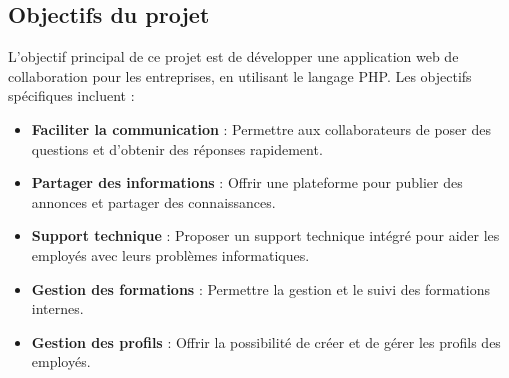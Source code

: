 \documentclass{article}
\begin{document}
        \subsection{Objectifs du projet}
            L'objectif principal de ce projet est de développer une application web de collaboration pour les entreprises, en utilisant le langage PHP. Les objectifs spécifiques incluent :

            \begin{itemize}
                \item \textbf{Faciliter la communication} : Permettre aux collaborateurs de poser des questions et d'obtenir des réponses rapidement.
                \item \textbf{Partager des informations} : Offrir une plateforme pour publier des annonces et partager des connaissances.
                \item \textbf{Support technique} : Proposer un support technique intégré pour aider les employés avec leurs problèmes informatiques.
                \item \textbf{Gestion des formations} : Permettre la gestion et le suivi des formations internes.
                \item \textbf{Gestion des profils} : Offrir la possibilité de créer et de gérer les profils des employés.
            \end{itemize}
\end{document}
